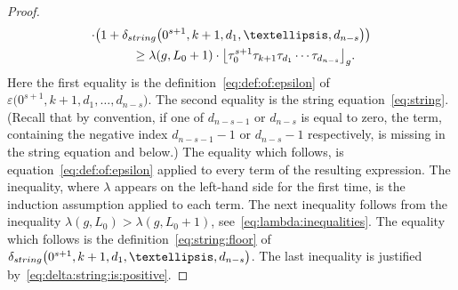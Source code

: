 \documentclass[11pt]{article}
\renewcommand{\epsilon}{\varepsilon}
\theoremstyle{definition}
\begin{document}
\begin{proof}
\begin{gather*}
\cdot\big(1+\delta_{\rm string}\big(0^{s+1},k+1,d_1,\dots,d_{n-s}\big)\big)\\
\qquad{} \ge \lambda(g,L_0+1)
\cdot\big\lfloor\tau_0^{s+1}\tau_{k+1}\tau_{d_1}\cdots\tau_{d_{n-s}}\big\rfloor_g.
\end{gather*}
Here the first equality is the definition~\eqref{eq:def:of:epsilon} of $\epsilon\big(0^{s+1},k+1,d_1,\dots,d_{n-s}\big)$. The second equality is the string equation~\eqref{eq:string}.
(Recall that by convention, if one of $d_{n-s-1}$ or $d_{n-s}$ is equal to zero, the term, containing the negative index $d_{n-s-1}-1$ or $d_{n-s}-1$ respectively, is missing in the string equation and below.)
The equality which follows, is equation~\eqref{eq:def:of:epsilon} applied to every term of the resulting expression. The inequality, where $\lambda$ appears on the left-hand side for the first time, is the induction assumption applied to each term. The next inequality follows from the inequality $\lambda(g,L_0)>\lambda(g,L_0+1)$,
see~\eqref{eq:lambda:inequalities}. The equality which follows is the definition~\eqref{eq:string:floor} of $\delta_{\rm string}\big(0^{s+1},k+1,d_1,\dots,d_{n-s}\big)$. The last inequality is justified by~\eqref{eq:delta:string:is:positive}.
\end{proof}
\end{document}
